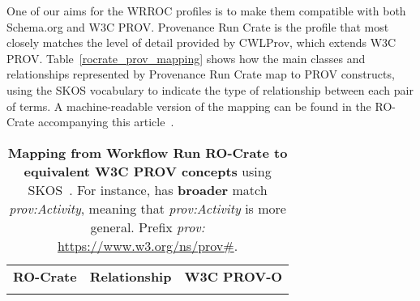 \documentclass[10pt,letterpaper]{article}
\newlength\savedwidth
\newcommand\thickhline{\noalign{\global\savedwidth\arrayrulewidth\global\arrayrulewidth 2pt}%
\hline
\noalign{\global\arrayrulewidth\savedwidth}}
\newcommand{\termsorg}[1]{\href{https://schema.org/#1}{\color{black}{\emph{s:#1}}}}
\begin{document}
One of our aims for the WRROC profiles is to make them compatible with both Schema.org and W3C PROV. Provenance Run Crate is the profile that most closely matches the level of detail provided by CWLProv, which extends W3C PROV. Table~\ref{rocrate_prov_mapping} shows how the main classes and relationships represented by Provenance Run Crate map to PROV constructs, using the SKOS vocabulary to indicate the type of relationship between each pair of terms. A machine-readable version of the mapping can be found in the RO-Crate accompanying this article~\cite{wrroc-crate,wrroc-crate-html}.

\begin{table}[h]
  \begin{adjustwidth}{-1.5cm}{0in}
  \centering
  \caption{
  {\bf Mapping from Workflow Run RO-Crate to equivalent W3C PROV concepts} using SKOS~\cite{Isaac 2009}. For instance, \termsorg{CreateAction} has \textbf{broader} match \emph{prov:Activity}, meaning that \emph{prov:Activity} is more general. Prefix \emph{prov:} \url{https://www.w3.org/ns/prov\#}.}
  \begin{tabular}{p{60mm}|p{40mm}|p{40mm}}
  \hline
  {\bf RO-Crate} & \textbf{Relationship} & {\bf W3C PROV-O} \\
  \thickhline


\end{tabular}
\end{adjustwidth}
\end{table}
\end{document}
